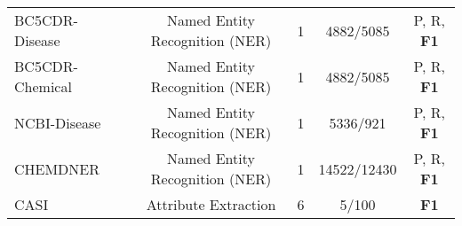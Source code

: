 \begin{table}[h]
{{\begin{tabular}{lcccc}
  BC5CDR-Disease~\citep{bc5cdr} & Named Entity Recognition (NER) & 1 & 4882/5085 & P, R, \textbf{F1}\\
  BC5CDR-Chemical~\citep{bc5cdr} & Named Entity Recognition (NER) & 1 & 4882/5085 & P, R, \textbf{F1}\\
  NCBI-Disease~\citep{ncbi-disease} & Named Entity Recognition (NER) & 1 & 5336/921 &  P, R, \textbf{F1}\\
  CHEMDNER~\citep{chemdner} & Named Entity Recognition (NER) & 1 & 14522/12430 &  P, R, \textbf{F1}\\
  CASI~\citep{agrawal2022large,claim} & Attribute Extraction & 6 & 5/100 & \textbf{F1}\\
  \bottomrule
  \end{tabular}
     }
  }

\end{table}

  
